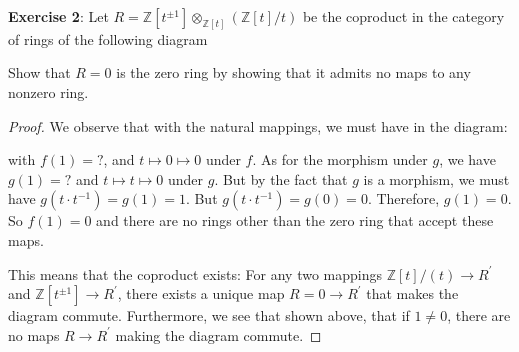 \documentclass{article}
\begin{document}
\textbf{Exercise 2}: Let $R = \mathbb{Z}[t^{\pm 1}] \otimes_{\mathbb{Z}[t]} (\mathbb{Z}[t]/t) $ be the coproduct in the category of rings of the following diagram
    \begin{center}
    \end{center}
Show that $R = 0$ is the zero ring by showing that it admits no maps to any nonzero ring.
    \begin{proof}
        We observe that with the natural mappings, we must have in the diagram:
            \begin{center}
            \end{center}
        with $f(1) = ?$, and $t \mapsto 0 \mapsto 0$ under $f$. As for the morphism under $g$, we have $g(1) = ?$ and $t \mapsto t \mapsto 0$ under $g$. But by the fact that $g$ is a morphism, we must have $g(t \cdot t^{-1}) = g(1) = 1$. But $g(t \cdot t^{-1}) = g(0) = 0$. Therefore, $g(1) = 0$. So $f(1) = 0$ and there are no rings other than the zero ring that accept these maps.

        This means that the coproduct exists: For any two mappings $\mathbb{Z}[t]/(t) \rightarrow R^{\prime}$ and $\mathbb{Z}[t^{\pm 1}] \rightarrow R^{\prime}$, there exists a unique map $R = 0 \rightarrow R^{\prime}$ that makes the diagram commute. Furthermore, we see that shown above, that if $1 \neq 0$, there are no maps $R \rightarrow R^{\prime}$ making the diagram commute.
    \end{proof}
\end{document}

